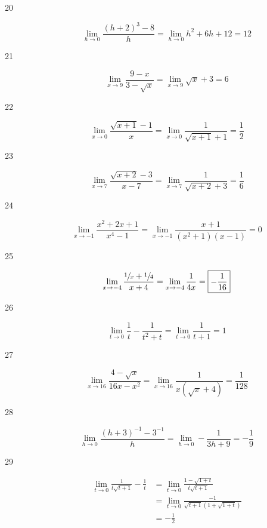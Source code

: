 \documentclass[letterpaper, landscape]{exam}
\begin{document}
\begin{description}
      \item[20]
        \[
          \lim_{h \to 0} \frac{(h+2)^3-8}{h} 
            = \lim_{h \to 0} h^2+6 h+12 = \boxed{ 12 } 
        \]

      \item[21]
        \[
          \lim_{x \to 9} \frac{9-x}{3-\sqrt{x}} 
            = \lim_{x \to 9} \sqrt{x}+3 = \boxed{ 6 } 
        \]

      \item[22]
        \[
          \lim_{x \to 0} \frac{\sqrt{x+1}-1}{x} 
            = \lim_{x \to 0} \frac{1}{\sqrt{x + 1} + 1} 
            = \boxed{ \frac{1}{2} } 
        \]

      \item[23]
        \[
          \lim_{x \to 7} \frac{\sqrt{x+2}-3}{x-7} 
            = \lim_{x \to 7} \frac{1}{\sqrt{x + 2} + 3} 
            = \boxed{ \frac{1}{6} } 
        \]

      \item[24]
        \[
          \lim_{x \to -1} \frac{x^2+2 x+1}{x^4-1} 
            = \lim_{x \to -1} \frac{x+1}{(x^2+1)(x-1)} 
            = \boxed{ 0 } 
        \]

      \item[25]
        \[
          \lim_{x \to -4} \frac{\sfrac{1}{x}+\sfrac{1}{4}}{x+4} 
            = \lim_{x \to -4} \frac{1}{4 x} 
            = \boxed{ -\frac{1}{16} } 
        \]

      \item[26]
        \[
          \lim_{t \to 0} \frac{1}{t}-\frac{1}{t^2+t} 
            = \lim_{t \to 0} \frac{1}{t + 1} 
            = \boxed{ 1 } 
        \]

      \item[27]
        \[
          \lim_{x \to 16} \frac{4-\sqrt{x}}{16 x-x^2} 
            = \lim_{x \to 16} \frac{1}{x (\sqrt{x} + 4)} 
            = \boxed{ \frac{1}{128} } 
        \]

      \item[28]
        \[
          \lim_{h \to 0} \frac{(h+3)^{-1}-3^{-1}}{h} 
            = \lim_{h \to 0} -\frac{1}{3 h+9} 
            = \boxed{ - \frac{1}{9} } 
        \]

      \item[29]
        \begin{align*}
          \lim_{t \to 0} \frac{1}{t \sqrt{t+1}}-\frac{1}{t} 
            & = \lim_{t \to 0} \frac{1 - \sqrt{1 + t}}{t \sqrt{t+1}} \\
            & = \lim_{t \to 0} \frac{-1}{\sqrt{t+1} (1 + \sqrt{1 + t})} \\
            & = \boxed{ - \frac{1}{2} }
        \end{align*}


\end{description}
\end{document}
